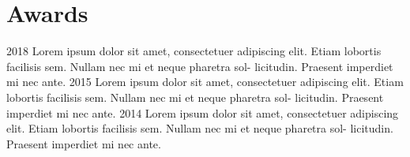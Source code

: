 \documentclass[%
  11pt,
  a4paper]{smooth-banner-cv}
\begin{document}
\section{Awards}

\begin{simplelist}
  \simplelistitem
      {2018}
      {Lorem ipsum dolor sit amet, consectetuer adipiscing elit. Etiam
        lobortis facilisis sem. Nullam nec mi et neque pharetra sol-
        licitudin. Praesent imperdiet mi nec ante.}
  \simplelistitem
      {2015}
      {Lorem ipsum dolor sit amet, consectetuer adipiscing elit. Etiam
        lobortis facilisis sem. Nullam nec mi et neque pharetra sol-
        licitudin. Praesent imperdiet mi nec ante.}
  \simplelistitem
      {2014}
      {Lorem ipsum dolor sit amet, consectetuer adipiscing elit. Etiam
        lobortis facilisis sem. Nullam nec mi et neque pharetra sol-
        licitudin. Praesent imperdiet mi nec ante.}
\end{simplelist}
\end{document}
